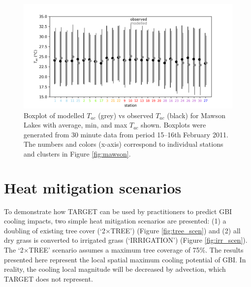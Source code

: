 \documentclass[gmd, manuscript]{copernicus}
\begin{document}
\begin{figure}[!htbp]

\includegraphics[width=1.0\textwidth,keepaspectratio]{figure8.png}

 \caption{Boxplot of modelled $T_{ac}$ (grey) vs observed $T_{ac}$ (black) for Mawson Lakes with average, min, and max $T_{ac}$ shown. Boxplots were generated from 30 minute data from period 15--16th February 2011.  The  numbers and colors (x-axis) correspond to individual stations and clusters in Figure \ref{fig:mawson}.} \label{fig:MawsonBox}


\end{figure}

\section{Heat mitigation scenarios}

To demonstrate how TARGET can be used by practitioners  to predict GBI cooling impacts, two simple heat mitigation scenarios are presented: (1) a doubling of existing tree cover (`2$\times$TREE') (Figure \ref{fig:tree_scen}) and (2) all dry grass is converted to irrigated grass (`IRRIGATION') (Figure \ref{fig:irr_scen}). The `2$\times$TREE' scenario assumes a maximum tree coverage of 75\%.   The results presented here represent the local spatial maximum cooling potential of GBI. In reality, the cooling local magnitude will be decreased by advection, which TARGET does not represent. 
\end{document}
